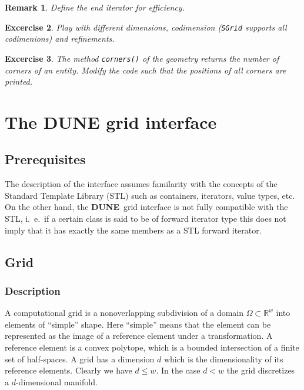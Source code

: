 \documentclass[11pt,a4paper,headinclude,footinclude,DIV14,BCOR8.25mm,titlepage,twoside,openright,normalheadings]{scrreprt}
\newcommand{\R}{\mathbb{R}}
\newcommand{\Dune}{{\sf\bfseries DUNE}}
\newtheorem{exc}{Excercise}[chapter]
\newtheorem{rem}[exc]{Remark}
\begin{document}
\begin{rem} Define the end iterator for efficiency. 
\end{rem}

\begin{exc} Play with different dimensions, codimension
  (\lstinline!SGrid! supports all codimenions) and refinements.
\end{exc}

\begin{exc} The method \lstinline!corners()! of the geometry returns
  the number of corners of an entity. Modify the code such that the
  positions of all corners are printed.
\end{exc}

\chapter{The DUNE grid interface}

\section{Prerequisites}

The description of the interface assumes familarity with the concepts
of the Standard Template Library (STL) such as containers, iterators, value
types, etc. On the other hand, the \Dune\ grid interface is not fully
compatible with the STL, i.~e.~if a certain class is said to be of
forward iterator type this does not imply that it has exactly the same
members as a STL forward iterator.  

\section{Grid}

\subsection{Description}

A computational grid is a nonoverlapping subdivision of a domain
$\Omega\subset\R^w$ into elements of ``simple'' shape. Here ``simple''
means that the element can be represented as the image of a reference
element under a transformation. A reference element is a convex
polytope, which is a bounded intersection of a finite set of
half-spaces. A grid has a dimension $d$ which is the dimensionality of
its reference elements. Clearly we have $d\leq w$. In the case $d<w$ the grid
discretizes a $d$-dimensional manifold. 
\end{document}
